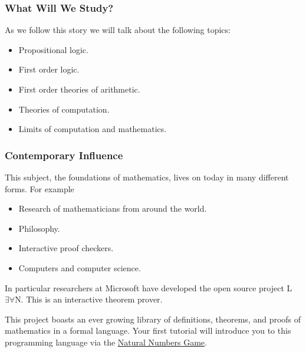 \documentclass{beamer}
\theoremstyle{indentDefn} \newtheorem{defn}[]{Definition}
\begin{document}
\begin{frame}
	\frametitle{What Will We Study?}
	
	As we follow this story we will talk about the following topics: 
	
	\vspace{0.2cm}
	
	\begin{itemize}
		\item Propositional logic.
		\item First order logic.
		\item First order theories of arithmetic.
		\item Theories of computation.
		\item Limits of computation and mathematics. 
	\end{itemize}
\end{frame}

\begin{frame}
	\frametitle{Contemporary Influence}
	
	This subject, the foundations of mathematics, lives on today in many different forms. For example 
	
	\begin{itemize}
		\item Research of mathematicians from around the world.
		\item Philosophy.
		\item Interactive proof checkers.
		\item Computers and computer science. 
	\end{itemize}

	In particular researchers at Microsoft have developed the open source project L$\exists \forall$N. This is an interactive theorem prover. 
	
	\vspace{0.2cm}
	
	This project boasts an ever growing library of definitions, theorems, and proofs of mathematics in a formal language. Your first tutorial will introduce you to this programming language via the	\href{https://www.ma.imperial.ac.uk/~buzzard/xena/natural_number_game/}{Natural Numbers Game}.

\end{frame}
\end{document}
